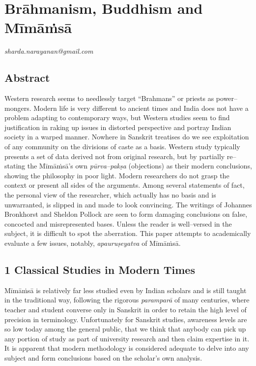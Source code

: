
\chapter{Brāhmanism, Buddhism and Mīmāṁsā}\label{chapter6}


\begin{flushright}
\textit{sharda.narayanan@gmail.com}
\end{flushright}


\section*{Abstract}

Western research seems to needlessly target “Brahmans” or priests as power–mongers. Modern life is very different to ancient times and India does not have a problem adapting to contemporary ways, but Western studies seem to find justification in raking up issues in distorted perspective and portray Indian society in a warped manner. Nowhere in Sanskrit treatises do we see exploitation of any community on the divisions of caste as a basis. Western study typically presents a set of data derived not from original research, but by partially re–stating the Mīmāṁsā’s own \textit{pūrva–pakṣa} (objections) as their modern conclusions, showing the philosophy in poor light. Modern researchers do not grasp the context or present all sides of the arguments. Among several statements of fact, the personal view of the researcher, which actually has no basis and is unwarranted, is slipped in and made to look convincing. The writings of Johannes Bronkhorst and Sheldon Pollock are seen to form damaging conclusions on false, concocted and misrepresented bases. Unless the reader is well–versed in the subject, it is difficult to spot the aberration. This paper attempts to academically evaluate a few issues, notably, \textit{apauruṣeyatva} of Mīmāṁsā.


\section*{1 Classical Studies in Modern Times}

Mīmāṁsā is relatively far less studied even by Indian scholars and is still taught in the traditional way, following the rigorous \textit{paramparā} of many centuries, where teacher and student converse only in Sanskrit in order to retain the high level of precision in terminology. Unfortunately for Sanskrit studies, awareness levels are so low today among the general public, that we think that anybody can pick up any portion of study as part of university research and then claim expertise in it. It is apparent that modern methodology is considered adequate to delve into any subject and form conclusions based on the scholar’s own analysis.

